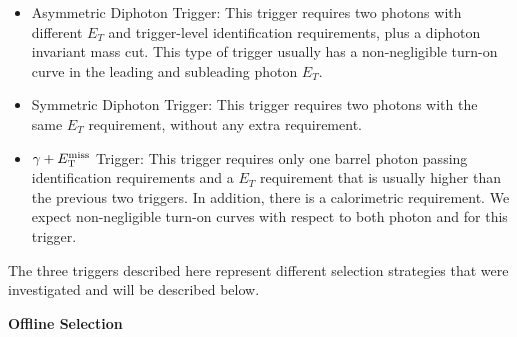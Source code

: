 \begin{itemize}
\item Asymmetric Diphoton Trigger: This trigger requires two photons with different $E_{T}$ and trigger-level identification requirements, plus a diphoton invariant mass cut. This type of trigger usually has a non-negligible turn-on curve in the leading and subleading photon  $E_{T}$.
\item Symmetric Diphoton Trigger: This trigger requires two photons with the same $E_{T}$ requirement, without any extra requirement.
\item $\gamma+E_{\mathrm{T}}^{\text{miss}}$ Trigger: This trigger requires only one barrel photon passing identification requirements and a $E_{T}$ requirement that is usually higher than the previous two triggers. In addition, there is a calorimetric \MET requirement. We expect non-negligible turn-on curves with respect to both photon and \MET for this trigger.
\end{itemize}

The three triggers described here represent different selection strategies that were investigated and will be described below.


\vspace{0.2cm} \textbf{Offline Selection}

